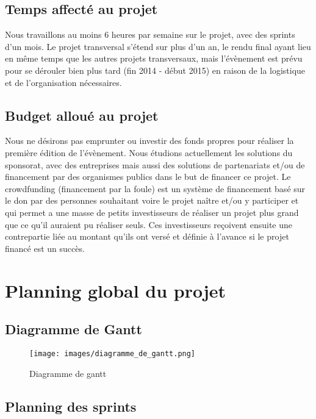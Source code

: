 \documentclass[french]{article}
\begin{document}
\subsection{Temps affecté au projet}

Nous travaillons au moins 6 heures par semaine sur le projet, avec des sprints d'un mois.
Le projet transversal s'étend sur plus d'un an, le rendu final ayant lieu en même temps que les autres projets transversaux, mais l'évènement est prévu pour se dérouler bien plus tard (fin 2014 - début 2015) en raison de la logistique et de l'organisation nécessaires.

\subsection{Budget alloué au projet}

Nous ne désirons pas emprunter ou investir des fonds propres pour réaliser la première édition de l'évènement.
Nous étudions actuellement les solutions du sponsorat, avec des entreprises mais aussi des solutions de partenariats et/ou de financement par des organismes publics dans le but de financer ce projet.
Le crowdfunding (financement par la foule) est un système de financement basé sur le don par des personnes souhaitant voire le projet naître et/ou y participer et qui permet a une masse de petits investisseurs de réaliser un projet plus grand que ce qu'il auraient pu réaliser seuls. Ces investisseurs reçoivent ensuite une contrepartie liée au montant qu'ils ont versé et définie à l'avance si le projet financé est un succès.

\section{Planning global du projet}

\subsection{Diagramme de Gantt}
\begin{figure}[h]
	\texttt{[image: images/diagramme\_de\_gantt.png]}
	\caption{Diagramme de gantt}
	\label{fig:Diagramme_de_gantt}
\end{figure}

\newpage

\subsection{Planning des sprints}
\end{document}
